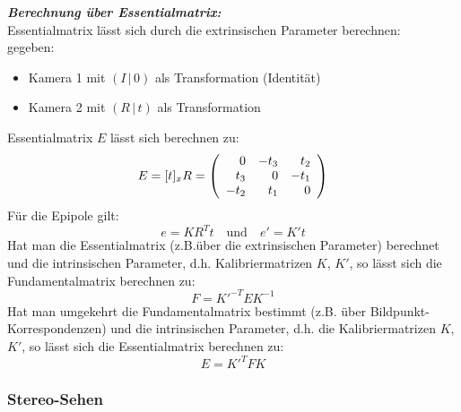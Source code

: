 \textbf{\textsl{Berechnung über Essentialmatrix:}} \\
Essentialmatrix lässt sich durch die extrinsischen Parameter berechnen: \\
gegeben:
\begin{itemize}
\item Kamera 1 mit $(I \, | \, 0)$ als Transformation (Identität)
\item Kamera 2 mit $(R \, | \, t)$ als Transformation
\end{itemize}
Essentialmatrix $E$ lässt sich berechnen zu: $$E = [t]_xR = \left( \begin{array}{rrr} 0 & -t_3 & t_2 \\ t_3 & 0 & -t_1 \\ -t_2 & t_1 & 0 \end{array} \right)$$ Für die Epipole gilt: $$e = KR^Tt \quad \textrm{und} \quad e' = K't$$
Hat man die Essentialmatrix (z.B.über die extrinsischen Parameter) berechnet und die intrinsischen Parameter, d.h. Kalibriermatrizen $K$, $K'$, so lässt sich die Fundamentalmatrix berechnen zu: $$F = K'^{-T}EK^{-1}$$
Hat man umgekehrt die Fundamentalmatrix bestimmt (z.B. über Bildpunkt-Korrespondenzen) und die intrinsischen Parameter, d.h. die Kalibriermatrizen $K$, $K'$, so lässt sich die Essentialmatrix berechnen zu: $$E = K'^TFK$$

\subsubsection*{Stereo-Sehen}

